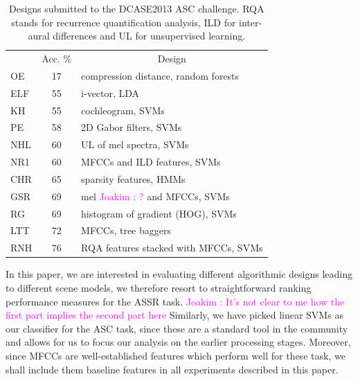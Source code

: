 \documentclass[journal]{IEEEtran}
\newcommand{\gl}[1]{\textcolor{red}{Gr\'egoire : #1}}
\newcommand{\ja}[1]{\textcolor{magenta}{Joakim : #1}}
\begin{document}
\begin{table}
\begin{center}
\begin{tabular}{lcl}
& Acc. \%  &  \multicolumn{1}{c}{Design}  \\
\cite{olivetti2013wonder} OE & 17 & compression distance, random forests \\
\cite{elizalde2013vector} ELF & 55 & i-vector, LDA \\
\cite{krijnders2013tone} KH & 55 & cochleogram, SVMs \\
\cite{patil2013multiresolution} PE & 58 & 2D Gabor filters, SVMs \\
\cite{lee2013acoustic} NHL & 60 & UL of mel spectra, SVMs \\
\cite{nogueira2013sound} NR1 & 60 & MFCCs and ILD features, SVMs \\
\cite{chum2013ieee} CHR & 65 & sparsity features, HMMs  \\
\cite{geiger2013large} GSR & 69 & mel \ja{?} and MFCCs, SVMs \\
\cite{rakotomamonjy2015histogram} RG & 69 & histogram of gradient (HOG), SVMs \\
\cite{li2013auditory} LTT & 72 & MFCCs, tree baggers \\
\cite{roma2013recurrence} RNH & 76 & RQA features stacked with MFCCs, SVMs \\
\end{tabular}
\end{center}
\caption{Designs submitted to the DCASE2013 ASC challenge. RQA stands for recurrence quantification analysis, ILD for inter-aural differences and UL for unsupervised learning. \label{tab:dcase}}
\end{table}

In this paper, we are interested in evaluating different algorithmic designs leading to different scene models, we therefore resort to straightforward ranking performance measures for the ASSR task. \ja{It's not clear to me how the first part implies the second part here} Similarly, we have picked linear SVMs as our classifier for the ASC task, since these are a standard tool in the community and allows for us to focus our analysis on the earlier processing stages. Moreover, since MFCCs are well-established features which perform well for these task, we shall include them baseline features in all experiments described in this paper.

\end{document}

